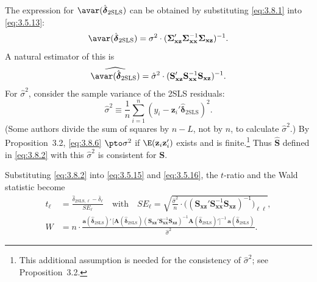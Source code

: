 The expression for $\avar(\hat{\boldsymbol{\delta}}_{\text{2SLS}})$ can be obtained by substituting
\eqref{eq:3.8.1} into \eqref{eq:3.5.13}:
\begin{equation}
  \avar(\hat{\boldsymbol{\delta}}_{\text{2SLS}})
  = \sigma^2 \cdot (\boldsymbol{\Sigma}_{\mathbf{xz}}'
    \boldsymbol{\Sigma}_{\mathbf{xx}}^{-1}
    \boldsymbol{\Sigma}_{\mathbf{xz}})^{-1}.
  \label{eq:3.8.4}
\end{equation}
A natural estimator of this is
\begin{equation}
  \widehat{\avar(\hat{\boldsymbol{\delta}}_{\text{2SLS}})}
  = \hat{\sigma}^2 \cdot (\mathbf{S}_{\mathbf{xz}}'
    \mathbf{S}_{\mathbf{xx}}^{-1}
    \mathbf{S}_{\mathbf{xz}})^{-1}.
  \label{eq:3.8.5}
\end{equation}
For $\hat{\sigma}^2$, consider the sample variance of the 2SLS residuals:
\begin{equation}
  \hat{\sigma}^2 \equiv \frac{1}{n} \sum_{i=1}^{n}
  (y_i - \mathbf{z}_i' \hat{\boldsymbol{\delta}}_{\text{2SLS}})^2.
  \label{eq:3.8.6}
\end{equation}
(Some authors divide the sum of squares by $n - L$, not by $n$, to calculate $\hat{\sigma}^2$.)
By Proposition~3.2, \eqref{eq:3.8.6} $\pto \sigma^2$ if
$\E(\mathbf{z}_i \mathbf{z}_i')$ exists and is finite.\footnote{This additional assumption is needed
for the consistency of $\hat{\sigma}^2$; see Proposition~3.2.}  Thus $\hat{\mathbf{S}}$ defined in
\eqref{eq:3.8.2} with this $\hat{\sigma}^2$ is consistent for $\mathbf{S}$.

Substituting \eqref{eq:3.8.2} into \eqref{eq:3.5.15} and \eqref{eq:3.5.16}, the $t$-ratio
and the Wald statistic become
\begin{align}
  t_\ell &= \frac{\hat{\delta}_{\text{2SLS},\ell} - \bar{\delta}_\ell}{SE_\ell}
  \quad \text{with} \quad
  SE_\ell = \sqrt{\frac{\hat{\sigma}^2}{n} \cdot
    \bigl((\mathbf{S}_{\mathbf{xz}}' \mathbf{S}_{\mathbf{xx}}^{-1}
    \mathbf{S}_{\mathbf{xz}})^{-1}\bigr)_{\!\ell\ell}},
  \label{eq:3.8.7} \\
  W &= n \cdot \frac{\mathbf{a}(\hat{\boldsymbol{\delta}}_{\text{2SLS}})'\,
    \bigl[\mathbf{A}(\hat{\boldsymbol{\delta}}_{\text{2SLS}})
    (\mathbf{S}_{\mathbf{xz}}' \mathbf{S}_{\mathbf{xx}}^{-1}
    \mathbf{S}_{\mathbf{xz}})^{-1}
    \mathbf{A}(\hat{\boldsymbol{\delta}}_{\text{2SLS}})'\bigr]^{-1}\,
    \mathbf{a}(\hat{\boldsymbol{\delta}}_{\text{2SLS}})}
    {\hat{\sigma}^2}.
  \label{eq:3.8.8}
\end{align}

